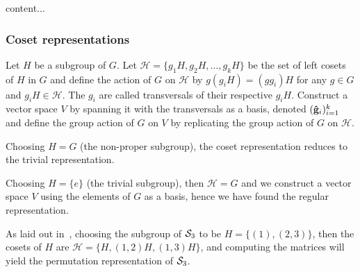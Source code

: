 	\begin{example}
		content...
	\end{example}

\subsubsection{Coset representations}

Let $H$ be a subgroup of $G$. Let $\mathcal{H} = \{g_1H, g_2H, \dots, g_kH\}$ be the set of left cosets of $H$ in $G$ and define the action of $G$ on $\mathcal{H}$ by $g(g_iH) = (gg_i)H$ for any $g\in G$ and $g_iH \in \mathcal{H}$. The $g_i$ are called transversals of their respective $g_iH$. Construct a vector space $V$ by spanning it with the transversals as a basis, denoted $(\mathbf{\hat{g}}_i)_{i=1}^k$ and define the group action of $G$ on $V$ by replicating the group action of $G$ on $\mathcal{H}$.\cite[Example 1.3.5.]{Sagan}

\begin{example}
	Choosing $H = G$ (the non-proper subgroup), the coset representation reduces to the trivial representation.
\end{example}

\begin{example}
	Choosing $H = \{e\}$ (the trivial subgroup), then $\mathcal{H} = G$ and we construct a vector space $V$ using the elements of $G$ as a basis, hence we have found the regular representation.
\end{example}

\begin{example}
	As laid out in~\cite[Example 1.3.5.]{Sagan}, choosing the subgroup of $\mathcal{S}_3$ to be $H = \{(1), (2,3)\}$, then the cosets of $H$ are $\mathcal{H} = \{ H, (1,2)H, (1,3)H \}$, and computing the matrices will yield the permutation representation of $\mathcal{S}_3$.
\end{example}